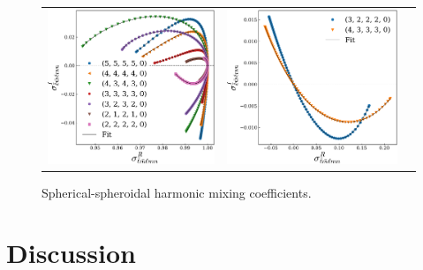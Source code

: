 \documentclass[twocolumn,aps,prd,floatfix,preprintnumbers,a4paper,nofootinbib,
superscriptaddress,10pt]{revtex4-1}
\begin{document}
\begin{figure}
  \begin{tabular}{lcr}
    \includegraphics[width=\figfactor\textwidth]{fig/issue2_ysprod_1.pdf} & \includegraphics[width=\figfactor\textwidth]{fig/issue2_ysprod_2.pdf}
  \end{tabular}
	\caption{ Spherical-spheroidal harmonic mixing coefficients. }
\end{figure}



%
\section{Discussion}
\label{discuss}



\end{document}
